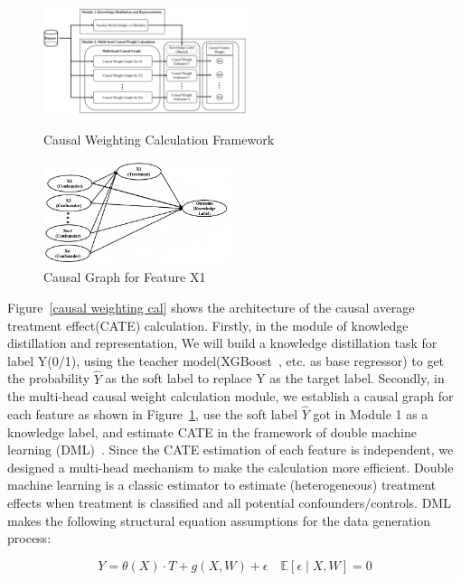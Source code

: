 \documentclass[sigconf,screen]{acmart}
\begin{document}
\begin{figure}[h]
\centering
\begin{minipage}[t]{0.48\textwidth}
\centering
\includegraphics[width=6cm]{Fig/causal_weighting.png}
\caption{Causal Weighting Calculation Framework}
\label{causal weighting cal}
\end{minipage}
\begin{minipage}[t]{0.48\textwidth}
\centering
\includegraphics[width=5.5cm]{Fig/causal_graph_x1.png}
\caption{Causal Graph for Feature X1}
\label{causal graph}
\end{minipage}
\end{figure}


Figure~\ref{causal weighting cal} shows the architecture of the causal average treatment effect(CATE) calculation. Firstly, in the module of knowledge distillation and representation, We will build a knowledge distillation task for label Y(0/1), using the teacher model(XGBoost~\citep{xgboost:Chen}, etc. as base regressor) to get the probability $\hat{Y}$ as the soft label to replace Y as the target label. Secondly, in the multi-head causal weight calculation module, we establish a causal graph for each feature as shown in Figure~\ref{causal graph}, use the soft label $\hat{Y}$ got in Module 1 as a knowledge label, and estimate CATE in the framework of double machine learning (DML)~\citep{DML:Chernozhukov}. Since the CATE estimation of each feature is independent, we designed a multi-head mechanism to make the calculation more efficient. Double machine learning is a classic estimator to estimate (heterogeneous) treatment effects when treatment is classified and all potential confounders/controls. DML makes the following structural equation assumptions for the data generation process:


\begin{equation}
Y=\theta(X) \cdot T+g(X, W)+\epsilon \quad \mathbb{E}[\epsilon \mid X, W]=0
\end{equation}
\end{document}
